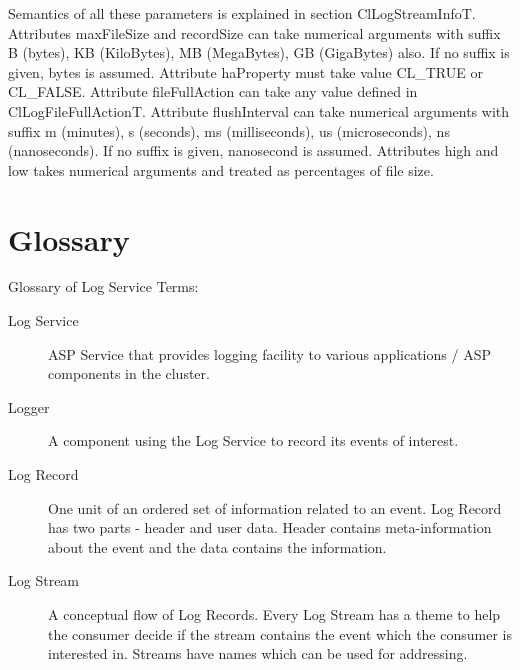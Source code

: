 \begin{flushleft}
\begin{verbatim}
\end{verbatim}
\normalsize

Semantics of all these parameters is explained in section ClLogStreamInfoT. Attributes maxFileSize and recordSize can take numerical arguments with 
suffix B (bytes), KB (KiloBytes), MB (MegaBytes), GB (GigaBytes) also. If no suffix is given, bytes is assumed. Attribute haProperty must take value 
CL\_\-TRUE or CL\_\-FALSE. Attribute fileFullAction can take any value defined in ClLogFileFullActionT. Attribute flushInterval can take numerical arguments with 
suffix m (minutes), s (seconds), ms (milliseconds), us (microseconds), ns (nanoseconds). If no suffix is given, nanosecond is assumed. Attributes 
high and low takes numerical arguments and treated as percentages of file size.








\chapter*{Glossary}
\begin{Desc}
\item[Glossary of Log Service Terms:]
\par
\par
\begin{description}

\item[Log Service] ASP Service that provides logging facility to various applications / ASP components in the cluster.
\end{description}
\begin{description}

\item[Logger] A component using the Log Service to record its events of interest.
\end{description}


\begin{description}

\item[Log Record] One unit of an ordered set of information related to an event. Log Record has two parts - header and user data. Header contains 
meta-information about the event and the data contains the information.
\end{description}

\begin{description}

\item[Log Stream] A conceptual flow of Log Records. Every Log Stream has a theme to help the consumer decide if the stream contains the event which 
the consumer is interested in. Streams have names which can be used for addressing.
\end{description}


\end{Desc}
\end{flushleft}
